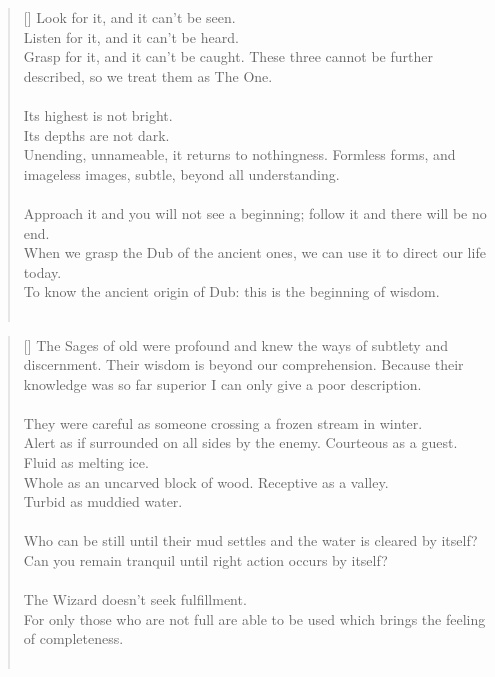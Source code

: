\documentclass{article}
\begin{document}
\settowidth{\versewidth}{The Wizard leads byemptying people’s minds, filling their bellies, weakening their am- bitions, and making them become strong}
\begin{verse}[\versewidth]
Look for it, and it can't be seen.\\
Listen for it, and it can't be heard.\\
Grasp for it, and it can't be caught. 
These three cannot be further described, so we treat them as The One.\\
\hfill\\
Its highest is not bright.\\
Its depths are not dark.\\
Unending, unnameable, it returns to nothingness. Formless forms, and imageless images, subtle, beyond all understanding.\\
\hfill\\
Approach it and you will not see a beginning; follow it and there will be no end.\\
When we grasp the Dub of the ancient ones, we can use it to direct our life today.\\
To know the ancient origin of Dub: this is the beginning of wisdom.\\
\hfill\\
\end{verse}

\settowidth{\versewidth}{The Wizard leads byemptying people’s minds, filling their bellies, weakening their am- bitions, and making them become strong}
\begin{verse}[\versewidth]
The Sages of old were profound and knew the ways of subtlety and discernment. 
Their wisdom is beyond our comprehension. 
Because their knowledge was so far superior I can only give a poor description.\\
\hfill\\
They were careful as someone crossing a frozen stream in winter.\\
Alert as if surrounded on all sides by the enemy. 
Courteous as a guest.\\
Fluid as melting ice.\\
Whole as an uncarved block of wood. 
Receptive as a valley.\\
Turbid as muddied water.\\
\hfill\\
Who can be still until their mud settles and the water is cleared by itself?\\
Can you remain tranquil until right action occurs by itself?\\
\hfill\\
The Wizard doesn't seek fulfillment.\\
For only those who are not full are able to be used which brings the feeling of completeness.\\
\hfill\\
\end{verse}
\end{document}
